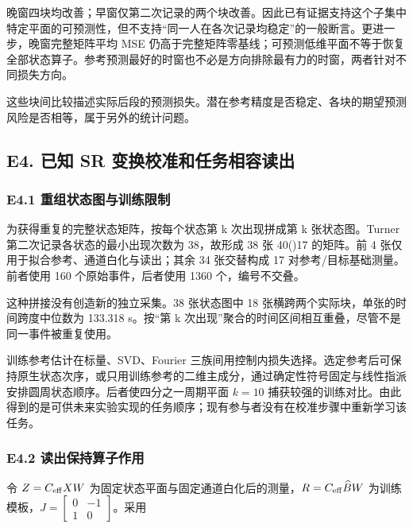 \documentclass[11pt,a4paper]{article}
\begin{document}
晚窗四块均改善；早窗仅第二次记录的两个块改善。因此已有证据支持这个子集中特定平面的可预测性，但不支持“同一人在各次记录均稳定”的一般断言。更进一步，晚窗完整矩阵平均
MSE
仍高于完整矩阵零基线；可预测低维平面不等于恢复全部状态算子。参考预测最好的时窗也不必是方向排除最有力的时窗，两者针对不同损失方向。

这些块间比较描述实际后段的预测损失。潜在参考精度是否稳定、各块的期望预测风险是否相等，属于另外的统计问题。

\subsection{E4. 已知 SR
变换校准和任务相容读出}\label{e4.-ux5df2ux77e5-sr-ux53d8ux6362ux6821ux51c6ux548cux4efbux52a1ux76f8ux5bb9ux8bfbux51fa}

\subsubsection{E4.1
重组状态图与训练限制}\label{e4.1-ux91cdux7ec4ux72b6ux6001ux56feux4e0eux8badux7ec3ux9650ux5236}

为获得重复的完整状态矩阵，按每个状态第 k 次出现拼成第 k 张状态图。Turner
第二次记录各状态的最小出现次数为 38，故形成 38 张 40(\times)17
的矩阵。前 4 张仅用于拟合参考、通道白化与读出；其余 34 张交替构成 17
对参考/目标基础测量。前者使用 160 个原始事件，后者使用 1360
个，编号不交叠。

这种拼接没有创造新的独立采集。38 张状态图中 18
张横跨两个实际块，单张的时间跨度中位数为 133.318 s。按“第 k
次出现”聚合的时间区间相互重叠，尽管不是同一事件被重复使用。

训练参考估计在标量、SVD、Fourier
三族间用控制内损失选择。选定参考后可保持原生状态次序，或只用训练参考的二维主成分，通过确定性符号固定与线性指派安排圆周状态顺序。后者使四分之一周期平面
\(k=10\)
捕获较强的训练对比。由此得到的是可供未来实验实现的任务顺序；现有参与者没有在校准步骤中重新学习该任务。

\subsubsection{E4.2
读出保持算子作用}\label{e4.2-ux8bfbux51faux4fddux6301ux7b97ux5b50ux4f5cux7528}

令 \(Z=C_{\rm eff}XW\)
为固定状态平面与固定通道白化后的测量，\(R=C_{\rm eff}\widehat BW\)
为训练模板，\(J=\left[\begin{smallmatrix}0&-1\\1&0\end{smallmatrix}\right]\)。采用
\end{document}

